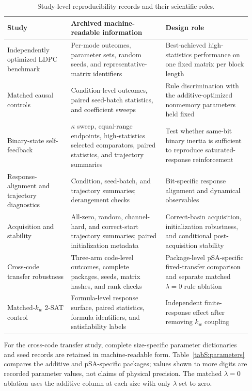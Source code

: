 \documentclass[aps,prapplied,preprint,superscriptaddress,longbibliography,floatfix]{revtex4-2}
\begin{document}
\begin{table}[ht]
\caption{Study-level reproducibility records and their scientific roles.}
\label{tabS:provenance}
\small
\begin{tabular}{@{}p{}p{}p{}@{}}
\toprule
\raggedright Study & \raggedright Archived machine-readable information & \raggedright Design role \tabularnewline
\midrule
\raggedright Independently optimized LDPC benchmark & \raggedright Per-mode outcomes, parameter sets, random seeds, and representative-matrix identifiers & \raggedright Best-achieved high-statistics performance on one fixed matrix per block length \tabularnewline
\raggedright Matched causal controls & \raggedright Condition-level outcomes, paired seed-batch statistics, and coefficient sweeps & \raggedright Rule discrimination with the additive-optimized nonmemory parameters held fixed \tabularnewline
\raggedright Binary-state self-feedback & \raggedright $\kappa$ sweep, equal-range endpoints, high-statistics selected comparators, paired statistics, and trajectory summaries & \raggedright Test whether same-bit binary inertia is sufficient to reproduce saturated-response reinforcement \tabularnewline
\raggedright Response-alignment and trajectory diagnostics & \raggedright Condition, seed-batch, and trajectory summaries; derangement checks & \raggedright Bit-specific response alignment and dynamical observables \tabularnewline
\raggedright Acquisition and stability & \raggedright All-zero, random, channel-hard, and correct-start trajectory summaries; paired initialization metadata & \raggedright Correct-basin acquisition, initialization robustness, and conditional post-acquisition stability \tabularnewline
\raggedright Cross-code transfer robustness & \raggedright Three-arm code-level outcomes, complete packages, seeds, matrix hashes, and rank checks & \raggedright Package-level pSA-specific fixed-transfer comparison and separate matched $\lambda=0$ rule ablation \tabularnewline
\raggedright Matched-$k_w$ 2-SAT control & \raggedright Formula-level response surface, paired statistics, formula identifiers, and satisfiability labels & \raggedright Independent finite-response effect after removing $k_w$ coupling \tabularnewline
\bottomrule
\end{tabular}
\end{table}

For the cross-code transfer study, complete size-specific parameter dictionaries and seed records are retained in machine-readable form.  Table~\ref{tabS:parameters} compares the additive and pSA-specific packages; values shown to more digits are recorded parameter values, not claims of physical precision.  The matched $\lambda=0$ ablation uses the additive column at each size with only $\lambda$ set to zero.
\end{document}
